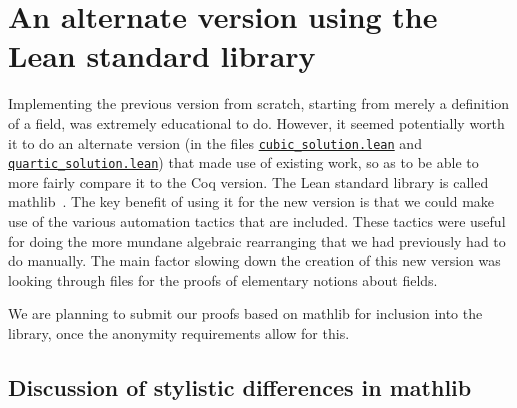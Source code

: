\documentclass{article} %
\theoremstyle{plain}
\theoremstyle{definition}
\newcommand{\Lean}{\textsf{Lean}\xspace}
\newcommand{\mathlib}{\textsf{mathlib}\xspace}
\begin{document}
\section{An alternate version using the \Lean standard library}
\label{sec:stdlib}

Implementing the previous version from scratch, starting from merely a definition of a field, was extremely educational to do.  
However, it seemed potentially worth it to do an alternate version (in the files 
\href{https://github.com/anonymousLeanDocsHosting/lean-polynomials/blob/main/mathlib/cubic_solution.lean}{\lstinline!cubic_solution.lean!} and
\href{https://github.com/anonymousLeanDocsHosting/lean-polynomials/blob/main/mathlib/quartic_solution.lean}{\lstinline!quartic_solution.lean!})
that made use of existing work, so as to be able to more fairly compare it to the Coq version.  
The \Lean standard library is called \mathlib~\cite{lean_mathlib}.  
The key benefit of using it for the new version is that we could make use of the various automation tactics that are included.  
These tactics were useful for doing the more mundane algebraic rearranging that we had previously had to do manually.  
The main factor slowing down the creation of this new version was looking through files for the proofs of elementary notions about fields.

We are planning to submit our proofs based on \mathlib for inclusion into the library, once the anonymity requirements allow for this.

\subsection {Discussion of stylistic differences in \mathlib} \label{sec:stdlib:compare}
\end{document}
